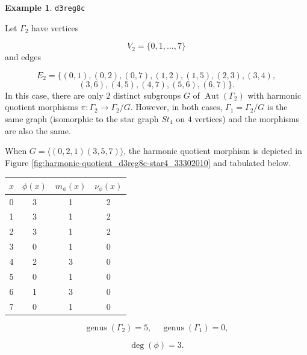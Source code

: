 \documentclass[12pt,letterpaper]{article}
\theoremstyle{definition}
\newtheorem{example}[theorem]{Example}
\DeclareMathOperator{\Aut}{Aut}
\DeclareMathOperator{\genus}{genus}
\begin{document}
\begin{example}%
\label{example:d3reg8c}
    {\tt d3reg8c}\newline
{\rm  
Let $\Gamma_2$ have vertices

\[
V_2=\{0,1,\dots,7\}
\]
and edges

\[
E_2 = \{
(0, 1), (0, 2), (0, 7), (1, 2), (1, 5), (2, 3), (3, 4),
\]
\[
(3, 6), (4, 5), (4, 7), (5, 6), (6, 7)
\}.
\]
In this case, there are only $2$ distinct
subgroups $G$ of $\Aut(\Gamma_2)$ with
harmonic quotient morphisms $\pi: \Gamma_2\to \Gamma_2/G$.
However, in both cases, $\Gamma_1=\Gamma_2/G$
is the same graph (isomorphic to the star graph $St_4$ on $4$ vertices)
and the morphisms are also the same.

When $G=\langle (0,2,1)(3,5,7) \rangle$, 
the harmonic quotient morphism is depicted in
Figure \ref{fig:harmonic-quotient_d3reg8c-star4_33302010}
and tabulated below.

\begin{center}
\begin{tabular}{c|c|c|c}  
  $x$ & $\phi(x)$ & $m_\phi(x)$ & $\nu_\phi(x)$ \\ \hline
  0   &    3   &        1         &  2   \\ 
  1   &    3   &        1         &  2   \\ 
  2   &    3    &       1         &  2   \\ 
  3   &    0   &        1         &  0   \\ 
  4   &    2   &        3         &  0   \\ 
  5   &    0   &        1         &  0    \\ 
  6   &    1   &        3         &  0   \\ 
  7   &    0   &        1         &  0   \\ 
\end{tabular}
\end{center}

\[
  \genus(\Gamma_2) =5,\ \ \ \ \
  \genus(\Gamma_1) =0,
\]

\[
\deg(\phi) =3.
\]

}
\end{example}
\end{document}
